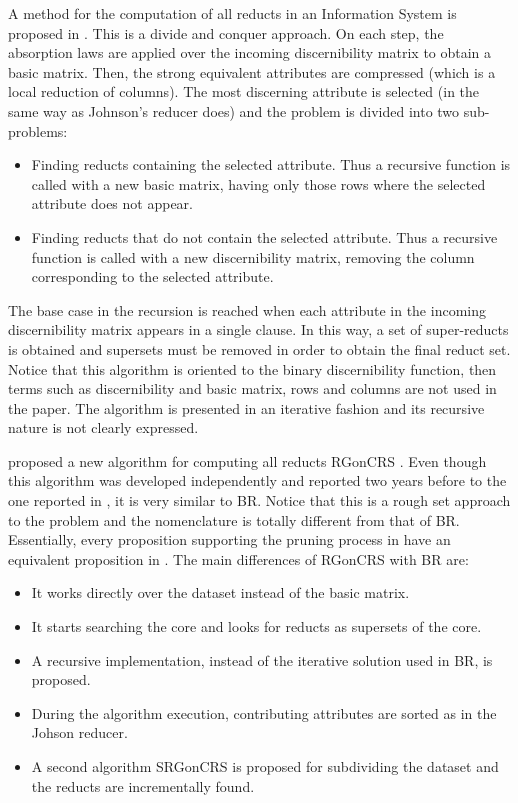 \documentclass[authoryear,11pt]{elsarticle}
\makeatletter
\newcommand{\setword}[2]{%
  \phantomsection
  #1\def\@currentlabel{\unexpanded{#1}}\label{#2}%
}
\makeatother
\begin{document}
  A method for the computation of all reducts in an Information System is proposed in
  \citep{Starzyk99,Starzyk00}.
  This is a divide and conquer approach. On each step, the absorption laws are applied over the incoming
  discernibility matrix to obtain a basic matrix. Then, the strong equivalent attributes are compressed
  (which is a local reduction of columns). The most discerning attribute is selected (in the same way as 
  Johnson's reducer does) and the problem is divided into two sub-problems: 
  \begin{itemize}
  \item Finding reducts containing the selected attribute. Thus a recursive function is called with a new basic 
  matrix, having only those rows where the selected attribute does not appear.
  \item Finding reducts that do not contain the selected attribute. Thus a recursive function is called with a new 
  discernibility matrix, removing the column corresponding to the selected attribute.
  \end{itemize}
  The base case in the recursion is reached when each attribute in the incoming discernibility matrix appears 
  in a single clause. In this way, a set of super-reducts is obtained and supersets must be removed in order 
  to obtain the final reduct set.
  Notice that this algorithm is oriented to the binary discernibility function, then 
  terms such as discernibility and basic matrix, rows and columns are not used in the paper. The
  algorithm is presented in an iterative fashion and its recursive nature is not clearly expressed.
  
  \cite{WangP07} proposed a new algorithm for computing all reducts \setword{RGonCRS}{RGonCRS}. 
  Even though this algorithm 
  was developed independently and reported two years before to the one reported in \citep{Lias09}, it is very 
  similar to BR. Notice that this is a rough set approach to the problem and the nomenclature is totally 
  different from that of BR. Essentially, every proposition supporting the pruning process in \citep{WangP07} 
  have an equivalent proposition in \citep{Lias09}. The main differences of RGonCRS with BR are:
  \begin{itemize}
  \item It works directly over the dataset instead of the basic matrix.
  \item It starts searching the core and looks for reducts as supersets of the core.
  \item A recursive implementation, instead of the iterative solution used in BR, is proposed.
  \item During the algorithm execution, contributing attributes are sorted as in the Johson reducer.
  \item A second algorithm \setword{SRGonCRS}{SRGonCRS} is proposed for subdividing the dataset and the reducts are
  		incrementally found.
  \end{itemize}
  
\end{document}
